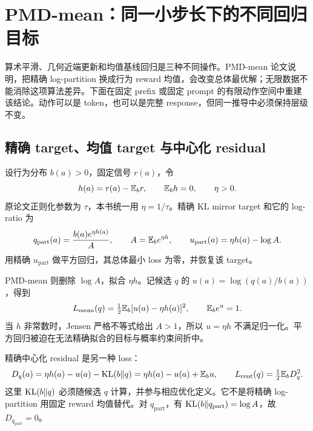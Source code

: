\section{PMD-mean：同一小步长下的不同回归目标}
\label{sec:pmdmean-comparison}

算术平滑、几何近端更新和均值基线回归是三种不同操作。PMD-mean 论文\cite{pmdmean26}说明，把精确 log-partition 换成行为 reward 均值，会改变总体最优解；无限数据不能消除这项算法差异。下面在固定 prefix 或固定 prompt 的有限动作空间中重建该结论。动作可以是 token，也可以是完整 response，但同一推导中必须保持层级不变。

\subsection{精确 target、均值 target 与中心化 residual}

设行为分布 $b(a)>0$，固定信号 $r(a)$，令
\[
 h(a)=r(a)-\mathbb{E}_b r,\qquad \mathbb{E}_bh=0,\qquad \eta>0.
\]
原论文正则化参数为 $\tau$，本书统一用 $\eta=1/\tau$。精确 KL mirror target 和它的 log-ratio 为
\begin{equation}
 q_{\mathrm{part}}(a)=\frac{b(a)e^{\eta h(a)}}{A},\qquad
 A=\mathbb{E}_b e^{\eta h},\qquad
 u_{\mathrm{part}}(a)=\eta h(a)-\log A.
 \label{eq:pmdmean-part-target}
\end{equation}
用精确 $u_{\mathrm{part}}$ 做平方回归，其总体最小 loss 为零，并恢复该 target。

PMD-mean 则删除 $\log A$，拟合 $\eta h$。记候选 $q$ 的 $u(a)=\log(q(a)/b(a))$，得到
\begin{equation}
 L_{\mathrm{mean}}(q)=\tfrac12\mathbb{E}_b[u(a)-\eta h(a)]^2,
 \qquad \mathbb{E}_b e^u=1.
 \label{eq:pmdmean-loss}
\end{equation}
当 $h$ 非常数时，Jensen 严格不等式给出 $A>1$，所以 $u=\eta h$ 不满足归一化。平方回归被迫在无法精确拟合的目标与概率约束间折中。

精确中心化 residual 是另一种 loss：
\begin{equation}
 D_q(a)=\eta h(a)-u(a)-\operatorname{KL}(b\Vert q)
 =\eta h(a)-u(a)+\mathbb{E}_bu,
 \qquad L_{\mathrm{cent}}(q)=\tfrac12\mathbb{E}_bD_q^2.
 \label{eq:pmdmean-centered-loss}
\end{equation}
这里 $\operatorname{KL}(b\Vert q)$ 必须随候选 $q$ 计算，并参与相应优化定义。它不是将精确 log-partition 用固定 reward 均值替代。对 $q_{\mathrm{part}}$，有 $\operatorname{KL}(b\Vert q_{\mathrm{part}})=\log A$，故 $D_{q_{\mathrm{part}}}=0$。

